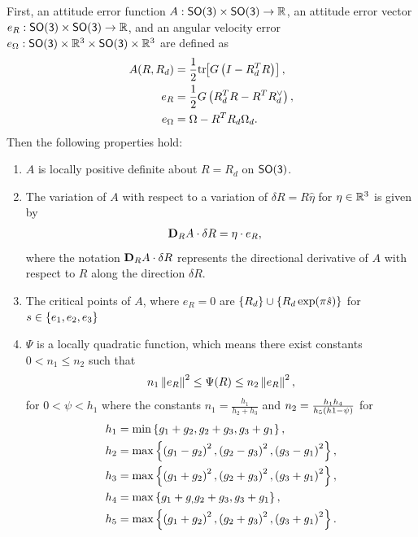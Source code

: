 \begin{prop}\label{prop:attitude_control_configuration_error}

First, an attitude error function \(A : \mathsf{SO(3)} \times \mathsf{SO(3)}  \to \mathbb{R} \), an attitude error vector \( e_R : \mathsf{SO(3)} \times \mathsf{SO(3)} \to \mathbb{R} \), and an angular velocity error \( e_\Omega : \mathsf{SO(3)} \times \mathbb{R}^3 \times \mathsf{SO(3)} \times \mathbb{R}^3 \) are defined as
\begin{subequations}\label{eq:attitude_error_function}
\begin{align}
    A(R, R_d) &= \frac{1}{2}  \mathrm{tr}\negthickspace\left[ G\left( I - R_d^T R \right) \right], \label{eq:A} \\
    e_R &= \frac{1}{2} G \left( R_d^T R - R^T R_d^\vee \right), \label{eq:eRA}\\
    e_\Omega &= \Omega - R^T R_d \Omega_d \label{eq:eWA}.
\end{align}
\end{subequations}
Then the following properties hold:
\begin{enumerate}
    \item \label{item:prop_A_psd} \( A \) is locally positive definite about \( R = R_d \) on \( \mathsf{SO(3)} \).
    \item \label{item:prop_eRA} The variation of \( A \) with respect to a variation of \( \delta R = R \hat{\eta} \) for \( \eta \in \mathbb{R}^3 \) is given by
	\begin{align}\label{eq:dirDiff_A}
		\mathbf{D}_{R} A \cdot \delta R &= \eta \cdot e_{R} ,
	\end{align}
	where the notation \( \mathbf{D}_{R} A \cdot \delta R \) represents the directional derivative of $A$ with respect to $R$ along the direction $\delta R$.
\item \label{item:prop_A_critical_points} The critical points of \( A \), where \( e_R = 0 \) are \( \left\{ R_d \right\} \cup \left\{ R_d \exp(\pi \hat s)  \right\} \) for \( s \in \left\{ e_1, e_2, e_3 \right\}\)
    \item \label{item:prop_A_quadratic} \( \Psi \) is a locally quadratic function, which means there exist constants \( 0 < n_1 \leq n_2 \) such that
    \begin{align}\label{eq:A_bound}
        n_1 \left\| e_R \right\|^2 \leq \Psi(R) \leq n_2 \left\| e_R \right\|^2 ,
    \end{align}
    for $0<\psi < h_1 $ where the constants \( n_1 = \frac{h_1}{h_2 + h_3} \) and \( n_2 = \frac{h_1 h_4}{h_5 \left( h1 - \psi \right) }\) for
	\begin{align*}
		h_1 &= \min\left\{ g_1 + g_2, g_2 + g_3 , g_3 + g_1 \right\} ,\\
		h_2 &= \max\left\{ \left( g_1 -g_2 \right)^2,\left( g_2 -g_3 \right)^2 , \left( g_3 -g_1 \right)^2 \right\} ,\\
		h_3 &= \max\left\{ \left( g_1 + g_2 \right)^2, \left( g_2 + g_3 \right)^2 , \left( g_3 + g_1 \right)^2 \right\}, \\		
        h_4 &= \max\left\{ g_1 + g_, g_2 +g_3, g_3 + g_1 \right\}, \\
        h_5 &= \max\left\{ \left( g_1 + g_2 \right)^2, \left( g_2 + g_3 \right)^2, \left( g_3 + g_1 \right)^2 \right\}.
	\end{align*}
\end{enumerate}
\end{prop}
